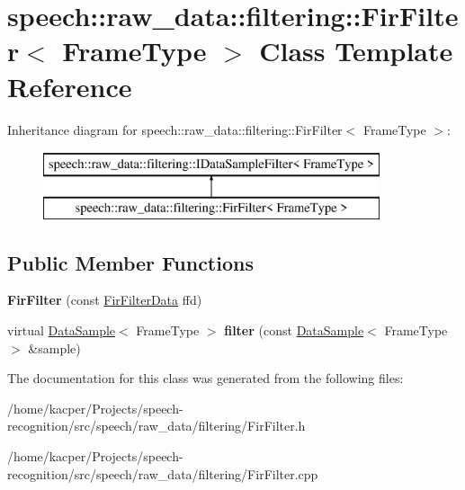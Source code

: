 \hypertarget{classspeech_1_1raw__data_1_1filtering_1_1FirFilter}{\section{speech\+:\+:raw\+\_\+data\+:\+:filtering\+:\+:Fir\+Filter$<$ Frame\+Type $>$ Class Template Reference}
\label{classspeech_1_1raw__data_1_1filtering_1_1FirFilter}
}
Inheritance diagram for speech\+:\+:raw\+\_\+data\+:\+:filtering\+:\+:Fir\+Filter$<$ Frame\+Type $>$\+:\begin{figure}[H]
\begin{center}
\leavevmode
\includegraphics[height=2.000000cm]{classspeech_1_1raw__data_1_1filtering_1_1FirFilter}
\end{center}
\end{figure}
\subsection*{Public Member Functions}
\begin{DoxyCompactItemize}
\item 
\hypertarget{classspeech_1_1raw__data_1_1filtering_1_1FirFilter_aed8d1d76c20929b4ec3d9c83c04580d4}{{\bfseries Fir\+Filter} (const \hyperlink{structspeech_1_1raw__data_1_1filtering_1_1FirFilterData}{Fir\+Filter\+Data} ffd)}\label{classspeech_1_1raw__data_1_1filtering_1_1FirFilter_aed8d1d76c20929b4ec3d9c83c04580d4}

\item 
\hypertarget{classspeech_1_1raw__data_1_1filtering_1_1FirFilter_a96b75db3b4b43d2387bff187d2e2e36f}{virtual \hyperlink{classspeech_1_1raw__data_1_1DataSample}{Data\+Sample}$<$ Frame\+Type $>$ {\bfseries filter} (const \hyperlink{classspeech_1_1raw__data_1_1DataSample}{Data\+Sample}$<$ Frame\+Type $>$ \&sample)}\label{classspeech_1_1raw__data_1_1filtering_1_1FirFilter_a96b75db3b4b43d2387bff187d2e2e36f}

\end{DoxyCompactItemize}


The documentation for this class was generated from the following files\+:\begin{DoxyCompactItemize}
\item 
/home/kacper/\+Projects/speech-\/recognition/src/speech/raw\+\_\+data/filtering/Fir\+Filter.\+h\item 
/home/kacper/\+Projects/speech-\/recognition/src/speech/raw\+\_\+data/filtering/Fir\+Filter.\+cpp\end{DoxyCompactItemize}
